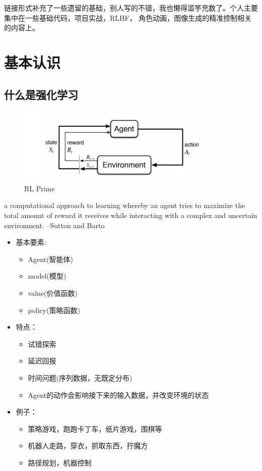 \documentclass[UTF8]{ctexart}
\begin{document}
链接形式补充了一些遗留的基础，别人写的不错，我也懒得滥竽充数了。个人主要集中在一些基础代码，项目实战，RLHF，
角色动画，图像生成的精准控制相关的内容上。

\newpage
\section{基本认识}
\subsection{什么是强化学习}

\begin{figure}[htbp]
	\centering
	\includegraphics[width=9.7cm, height=3.7cm]{./pic/rl.png}
    \caption{RL Prime}
    \label{subrl1}
\end{figure}
a computational approach to learning whereby an agent tries
to maximize the total amount of reward it receives while
interacting with a complex and uncertain environment. --Sutton and Barto

\begin{itemize}

    \item 基本要素:
    \begin{itemize}
        \item Agent(智能体)
        \item model(模型)
        \item value(价值函数)
        \item policy(策略函数)
    \end{itemize}

    \item 特点：
    \begin{itemize}
        \item 试错探索
        \item 延迟回报
        \item 时间问题(序列数据，无既定分布)
        \item Agent的动作会影响接下来的输入数据，并改变环境的状态
    \end{itemize}
    \item 例子：

    \begin{itemize}
        \item 策略游戏，跑跑卡丁车，纸片游戏，围棋等
        \item 机器人走路，穿衣，抓取东西，拧魔方
        \item 路径规划，机器控制
    \end{itemize}
    
\end{itemize}
\end{document}
